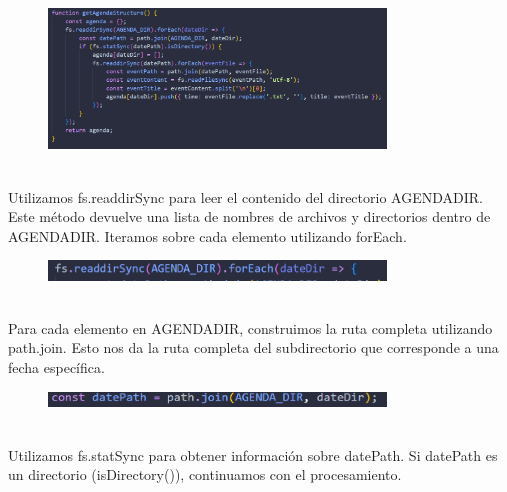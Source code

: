 \documentclass{article}
\begin{document}
    \begin{figure}[H]
		          \centering
		          \includegraphics[width=0.8\textwidth,keepaspectratio]                       {img/strucAg.png}
    \end{figure}
\\Utilizamos fs.readdirSync para leer el contenido del directorio AGENDADIR. Este método devuelve una lista de nombres de archivos y directorios dentro de AGENDADIR. Iteramos sobre cada elemento utilizando forEach.

    \begin{figure}[H]
		          \centering
		          \includegraphics[width=0.8\textwidth,keepaspectratio]                       {img/dirAg.png}
    \end{figure}

\\Para cada elemento en AGENDADIR, construimos la ruta completa utilizando path.join. Esto nos da la ruta completa del subdirectorio que corresponde a una fecha específica.

     \begin{figure}[H]
		          \centering
		          \includegraphics[width=0.8\textwidth,keepaspectratio]                       {img/rutaFec.png}
    \end{figure}

\\Utilizamos fs.statSync para obtener información sobre datePath. Si datePath es un directorio (isDirectory()), continuamos con el procesamiento.
\end{document}
